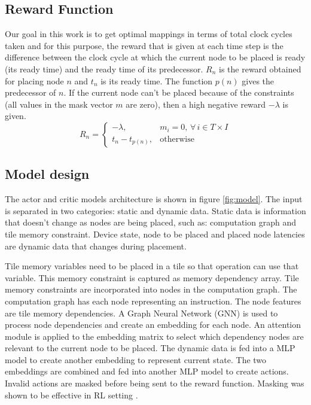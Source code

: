 \subsection{Reward Function}
Our goal in this work is to get optimal mappings in terms of total clock cycles taken and for this purpose, the reward that is given at each time step is the difference between the clock cycle at which the current node to be placed is ready (its ready time) and the ready time of its predecessor. $R_n$ is the reward obtained for placing node $n$ and $t_n$ is its ready time. The function $p(n)$ gives the predecessor of $n$. If the current node can't be placed because of the constraints (all values in the mask vector $m$ are zero), then a high negative reward $-\lambda$ is given.
\[
  R_n =
  \begin{cases}
    -\lambda,& m_i = 0, \, \forall \, i \in T \times I \\
    t_n - t_{p(n)}, & \text{otherwise}
    
  \end{cases}
\]






\subsection{Model design}

The actor and critic models architecture is shown in figure \ref{fig:model}. 
The input is separated in two categories: static and dynamic data. 
Static data is information that doesn't change as nodes are being placed, such as: computation graph and tile memory constraint.
Device state, node to be placed and placed node latencies are dynamic data that changes during placement.

Tile memory variables need to be placed in a tile so that operation can use that variable. 
This memory constraint is captured as memory dependency array. 
Tile memory constraints are incorporated into nodes in the computation graph. 
The computation graph has each node representing an instruction. 
The node features are tile memory dependencies. 
A Graph Neural Network (GNN) is used to process node dependencies and create an embedding for each node. 
An attention module is applied to the embedding matrix to select which dependency nodes are relevant to the current node to be placed. The dynamic data is fed into a MLP model to 
create another embedding to represent current state. 
The two embeddings are combined and fed into another MLP model to 
create actions. 
Invalid actions are masked before being sent to the reward function. Masking was shown to be effective in RL setting \cite{Shengyi_mask}.

